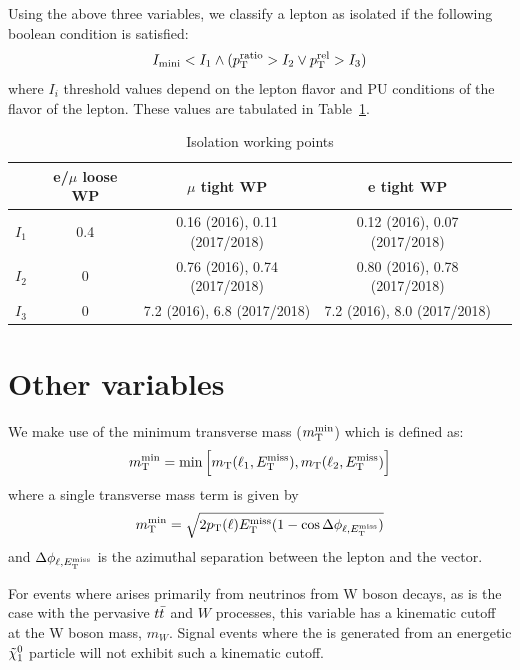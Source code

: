 Using the above three variables, we classify a lepton
as isolated if the following boolean condition is satisfied:
\begin{equation}
  I_\mathrm{mini} < I_1 \wedge ( p_{\mathrm{T}}^\text{ratio} > I_2 \vee p_{\mathrm{T}}^\text{rel} > I_3 )
\end{equation}
where $I_i$ threshold values depend on the lepton flavor and PU conditions
of the flavor of the lepton. These values are tabulated in Table~\ref{tab:isoWPs}.

\begin{table}[h]
    \label{tab:isoWPs}
    \centering
    \caption{Isolation working points }
    {\renewcommand{\arraystretch}{1.3}
    \begin{tabular}{l|cccc}
        \hline
        & e/$\mu$ loose WP &  $\mu$ tight WP & e tight WP \\ \hline 
        $I_1$ & 0.4 & 0.16 (2016), 0.11 (2017/2018) & 0.12 (2016), 0.07 (2017/2018) \\
        $I_2$ & 0  & 0.76 (2016), 0.74 (2017/2018) & 0.80 (2016), 0.78 (2017/2018) \\
        $I_3$ & 0  & 7.2 (2016), 6.8 (2017/2018) & 7.2 (2016), 8.0 (2017/2018) \\ \hline
    \end{tabular}}
\end{table}

\section{Other variables}

We make use of the minimum transverse mass ($m_{\mathrm{T}}^{\text{min}}$) which is defined as:
\begin{equation}
    m_{\mathrm{T}}^{\text{min}} = \mathrm{min}\left[ m_{\mathrm{T}}(\ell_1, E_{\mathrm{T}}^{\text{miss}}), m_{\mathrm{T}}(\ell_2, E_{\mathrm{T}}^{\text{miss}})\right ]
\end{equation}
where a single transverse mass term is given by
\begin{equation}
    m_{\mathrm{T}}^{\text{min}} = \sqrt{2p_{\mathrm{T}}(\ell) E_{\mathrm{T}}^{\text{miss}} (1-\cos\Delta \phi_{\ell,E_{\mathrm{T}}^{\text{miss}}})}
\end{equation}
and $\Delta \phi_{\ell,E_{\mathrm{T}}^{\text{miss}}}$ is the azimuthal separation between the lepton
and the \ptmiss vector.

For events where \ptmiss arises primarily from neutrinos from W boson decays,
as is the case with the pervasive $t\bar{t}$ and $W$ processes, this variable
has a kinematic cutoff at the W boson mass, $m_{W}$. Signal events
where the \ptmiss is generated from an energetic $\tilde{\chi}_1^0$ particle
will not exhibit such a kinematic cutoff.

